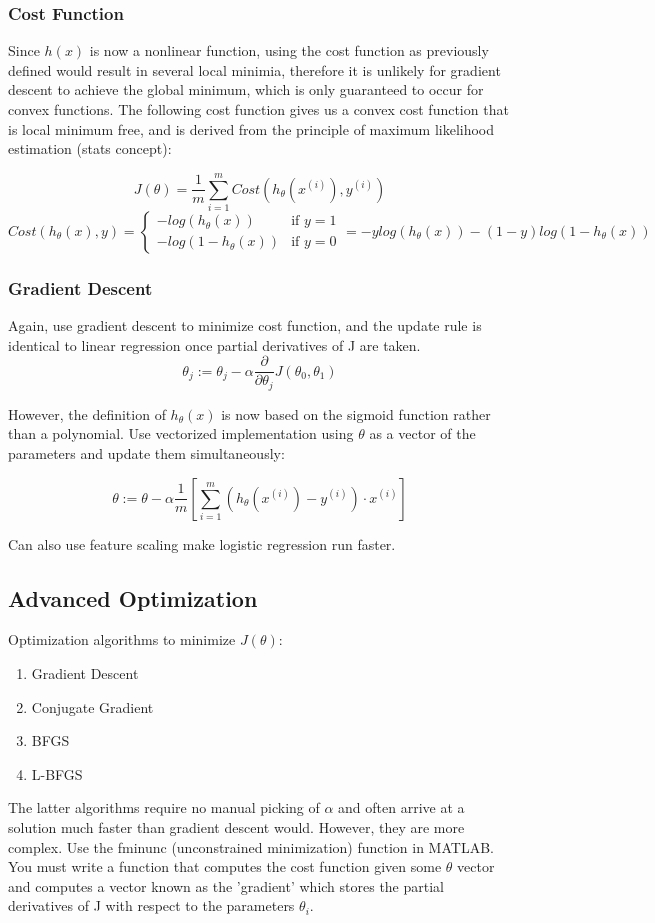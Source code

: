 \documentclass[11pt,letterpaper]{article}
\begin{document}
\subsubsection{Cost Function}
Since $h(x)$ is now a nonlinear function, using the cost function as previously defined would result in several local minimia, therefore it is unlikely for gradient descent to achieve the global minimum, which is only guaranteed to occur for convex functions. The following cost function gives us a convex cost function that is local minimum free, and is derived from the principle of maximum likelihood estimation (stats concept):
 

$$ J(\theta) = \frac{1}{m} \sum_{i=1}^m Cost(h_\theta(x^{(i)}),y^{(i)}) $$
\[ 
Cost(h_\theta(x),y) =
\begin{cases}
      -log(h_\theta(x)) & \textrm{if } y = 1\\
      -log(1 - h_\theta(x)) & \textrm{if } y = 0
\end{cases}
= -ylog(h_\theta(x)) - (1-y)log(1-h_\theta(x))
\]

\subsubsection{Gradient Descent}
Again, use gradient descent to minimize cost function, and the update rule is identical to linear regression once partial derivatives of J are taken.
$$\theta_j := \theta_j - \alpha \frac{\partial}{\partial \theta_j} J(\theta_0, \theta_1)$$

However, the definition of $h_\theta(x)$ is now based on the sigmoid function rather than a polynomial. Use vectorized implementation using $\theta$ as a vector of the parameters and update them simultaneously:

$$\theta := \theta - \alpha \frac{1}{m}[\sum_{i=1}^{m}( h_\theta(x^{(i)})-y^{(i)}) \cdot x^{(i)}] $$

Can also use feature scaling make logistic regression run faster.

\subsection{Advanced Optimization}
Optimization algorithms to minimize $J(\theta)$:
\begin{enumerate}
	\item Gradient Descent
	\item Conjugate Gradient
	\item BFGS
	\item L-BFGS
\end{enumerate}
The latter algorithms require no manual picking of $\alpha$ and often arrive at a solution much faster than gradient descent would. However, they are more complex. Use the fminunc (unconstrained minimization) function in MATLAB. You must write a function that computes the cost function given some $\theta$ vector and computes a vector known as the 'gradient' which stores the partial derivatives of J with respect to the parameters $\theta_i$.
\end{document}
